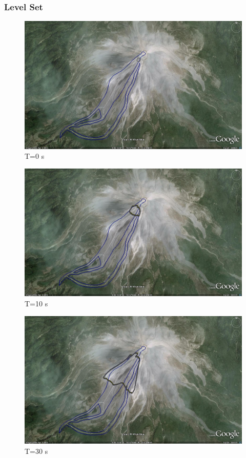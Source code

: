 \documentclass[letterpaper,10pt]{article}
\begin{document}
\subsubsection{Level Set}


\begin{figure}[H]
\centerline{\includegraphics[width=.9\textwidth]{IMAGES/pics/level0.jpg}}
\caption{T=0 s}
\label{level0}
\end{figure}
\begin{figure}[H]
\centerline{\includegraphics[width=.9\textwidth]{IMAGES/pics/level1.jpg}}
\caption{T=10 s}
\label{level01}
\end{figure}
\begin{figure}[H]
\centerline{\includegraphics[width=.9\textwidth]{IMAGES/pics/level3.jpg}}
\caption{T=30 s}
\label{level02}
\end{figure}
\end{document}

